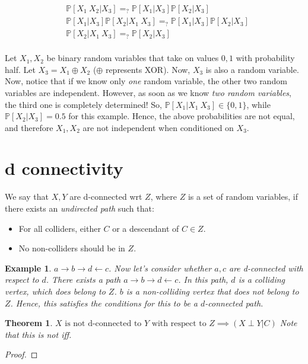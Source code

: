 \documentclass[11pt]{book}
\renewcommand{\P}[1]{\ensuremath{\mathbb{P} \left[ #1 \right]}}
\newtheorem{theorem}{Theorem}
\newtheorem{proof}{Proof}
\newtheorem{example}{Example}
\begin{document}
\begin{align*}
 &\P{X_1~ X_2 | X_3} =_? \P{X_1 | X_3} \P{X_2 | X_3} \\
 &\P{X_1|X_3}\P{X_2 | X_1 ~X_3} =_? \P{X_1 | X_3} \P{X_2 | X_3} \\
 &\P{X_2 | X_1 ~X_3} =_? \P{X_2 | X_3} \\
\end{align*}

Let $X_1, X_2$ be binary random variables that take on values ${0, 1}$ with
probability half. Let $X_3 = X_1 \oplus X_2$ ($\oplus$ represents XOR). Now,
$X_3$ is also a random variable. Now, notice that if we know only \textit{one}
random variable, the other two random variables are independent. However,
as soon as we know \textit{two random variables}, the third one
is completely determined!  So, $\P{X_1 | X_1 ~ X_3} \in \{0, 1\}$, while $\P{X_2 | X_3} = 0.5$ for this example.
Hence, the above probabilities are not equal, and therefore $X_1, X_2$ are
not independent when conditioned on $X_3$.

\section{d connectivity}

We say that $X, Y$ are d-connected wrt $Z$, where $Z$ is a set
of random variables, if there exists an \emph{undirected path}
such that:
\begin{itemize}
    \item For all colliders, either $C$ or a descendant of $C \in Z$.
    \item No non-colliders should be in $Z$.
\end{itemize}

\begin{example}
    $a \rightarrow b \rightarrow d \leftarrow c$.
    Now let's consider whether $a, c$ are d-connected with respect to $d$.
    There exists a path $a \rightarrow b \rightarrow d \leftarrow c$. In this
    path, $d$ is a colliding vertex, which does belong to $Z$. $b$ is a
    non-colliding vertex that does not belong to $Z$. Hence, this satisfies the
    conditions for this to be a $d$-connected path.
\end{example}

\begin{theorem}
    $\text{$X$ is not d-connected to $Y$ with respect to $Z$} \implies (X \perp Y | C)$ 
    Note that this is not iff.
\end{theorem}
\begin{proof}
\end{proof}
\end{document}
